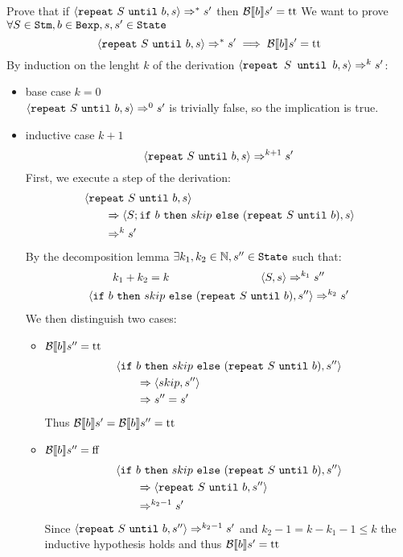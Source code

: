 \begin{exercise}{
    Prove that if $\left<\texttt{repeat}\ S\ \texttt{until}\ b, s\right> \Rightarrow^* s'$ then $\mathcal{B} \llbracket b \rrbracket s' = \text{tt}$ \vspace*{0.4cm}
}
    We want to prove $\forall S \in \texttt{Stm}, b \in \texttt{Bexp}, s, s' \in \texttt{State}$
    \[ \left<\texttt{repeat}\ S\ \texttt{until}\ b, s\right> \Rightarrow^* s' \implies \mathcal{B} \llbracket b \rrbracket s' = \text{tt} \]
    By induction on the lenght $k$ of the derivation $\left<\texttt{repeat } S \texttt{ until } b, s\right> \Rightarrow^k s'$:
    \begin{itemize}
        \item base case $k=0$ \\
            $\left<\texttt{repeat}\ S\ \texttt{until}\ b, s\right> \Rightarrow^0 s'$ is trivially false, so the implication is true.
        \item inductive case $k+1$
            \[ \left<\texttt{repeat}\ S\ \texttt{until}\ b, s\right> \Rightarrow^{k+1} s' \]
            First, we execute a step of the derivation:
            \begin{align*}
                &\left<\texttt{repeat}\ S\ \texttt{until}\ b, s\right>
                \\&\qquad \Rightarrow \left<S; \texttt{if}\ b\ \texttt{then}\ skip\ \texttt{else}\ (\texttt{repeat}\ S\ \texttt{until}\ b), s\right>
                \\&\qquad \Rightarrow^k s'
            \end{align*}
            By the decomposition lemma $\exists k_1, k_2 \in \mathbb{N}, s'' \in \texttt{State}$ such that:
            \begin{gather*}
                k_1 + k_2 = k \qquad\qquad\qquad\qquad
                \left<S, s\right> \Rightarrow^{k_1} s'' \\
                \left<\texttt{if}\ b\ \texttt{then}\ skip\ \texttt{else}\ (\texttt{repeat}\ S\ \texttt{until}\ b), s''\right> \Rightarrow^{k_2} s'
            \end{gather*}
            We then distinguish two cases:
            \begin{itemize}
                \item $\mathcal{B} \llbracket b \rrbracket s'' = \text{tt}$
                    \begin{align*}
                        &\left<\texttt{if}\ b\ \texttt{then}\ skip\ \texttt{else}\ (\texttt{repeat}\ S\ \texttt{until}\ b), s''\right>
                        \\&\qquad \Rightarrow \left<skip, s''\right>
                        \\&\qquad \Rightarrow s'' = s'
                    \end{align*}
                    Thus $\mathcal{B} \llbracket b \rrbracket s' = \mathcal{B} \llbracket b \rrbracket s'' = \text{tt}$
                \item $\mathcal{B} \llbracket b \rrbracket s'' = \text{ff}$
                    \begin{align*}
                        &\left<\texttt{if}\ b\ \texttt{then}\ skip\ \texttt{else}\ (\texttt{repeat}\ S\ \texttt{until}\ b), s''\right>
                        \\&\qquad \Rightarrow \left<\texttt{repeat}\ S\ \texttt{until}\ b, s''\right>
                        \\&\qquad \Rightarrow^{k_2 - 1} s'
                    \end{align*}
                    Since $\left<\texttt{repeat}\ S\ \texttt{until}\ b, s''\right> \Rightarrow^{k_2 - 1} s'$ and $k_2 - 1 = k - k_1 - 1 \leq k$ the inductive hypothesis holds and thus $\mathcal{B} \llbracket b \rrbracket s' = \text{tt}$
            \end{itemize}
    \end{itemize}
\end{exercise}
